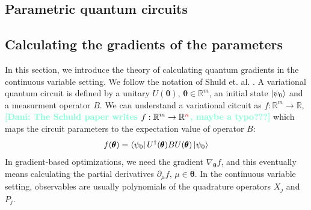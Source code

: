 \documentclass[12pt, a4paper,  nobibnotes]{article}
\newcommand{\red}[1]{\textcolor{red}{#1}}
\newcommand{\nd}[1]{\textcolor{Aquamarine}{\textbf{[Dani: #1]}}}
\begin{document}
\subsection{Parametric quantum circuits}
\subsection{Calculating the gradients of the parameters}
In this section, we introduce the theory of calculating quantum gradients in the continuous variable setting. 
We follow the notation of Shuld et. al. \cite{AnalyticGradientsSchuld}. A variational quantum circuit is 
defined by a unitary $U(\pmb\theta),\, \pmb\theta\in\mathbb{R}^m$, an initial state $\ket{\psi_0}$ and a measurment 
operator $B$. We can understand a variational citcuit as $f:\mathbb{R}^m \rightarrow \mathbb{R}$, \nd{The Schuld paper writes $f:\mathbb{R}^m \rightarrow \mathbb{R}^{\red n}$, maybe a typo???} 
which maps the circuit parameters to the expectation value of operator $B$:
\begin{equation}
    f(\pmb\theta) = \bra{\psi_0}U^{\dagger}(\pmb\theta) B U(\pmb\theta)\ket{\psi_0}   
\end{equation}
In gradient-based optimizations, we need the gradient $\nabla_{\pmb\theta} f$, and this eventually means calculating the partial derivatives
$\partial_{\mu}f,\,\mu\in\pmb\theta$. In the continuous variable setting, observables are usually polynomials of the quadrature operators $X_j$ and $P_j$.
\end{document}
